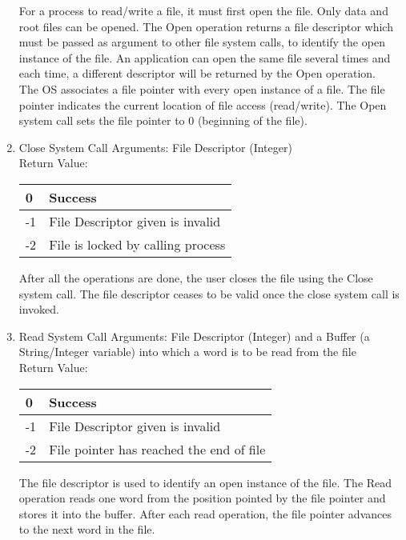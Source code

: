\begin{enumerate}
For a process to read/write a file, it must first open the file. Only data and root files can be opened. The Open operation returns a file descriptor which must be passed as argument to other file system calls, to identify the open instance of the file. An application can open the same file several times and each time, a different descriptor will be returned by the Open operation. 
\\
The OS associates a file pointer with every open instance of a file. The file pointer indicates the current location of file access (read/write). The Open system call sets the file pointer to 0 (beginning of the file).


\item{Close System Call}
Arguments: File Descriptor (Integer)\\
Return Value:
\FloatBarrier \begin{table}[H]
\centering
\begin{tabular}{|l|l|}
\hline
0  & Success           \\ \hline
-1 & File Descriptor given is invalid  \\ \hline
-2 & File is locked by calling process \\ \hline
\end{tabular}
\end{table} \FloatBarrier 

 After all the operations are done, the user closes the file using the Close system call. The file descriptor ceases to be valid once the close system call is invoked. 


\item{Read System Call}
Arguments: File Descriptor (Integer) and a Buffer (a String/Integer variable) into which a word is to be read from the file\\
Return Value:
\FloatBarrier \begin{table}[H]
\centering
\begin{tabular}{|l|l|}
\hline
0  & Success           \\ \hline
-1 & File Descriptor given is invalid  \\ \hline
-2 & File pointer has reached the end of file \\ \hline
\end{tabular}
\end{table} \FloatBarrier 

The file descriptor is used to identify an open instance of the file. The Read operation reads one word from the position pointed by the file pointer and stores it into the buffer. After each read operation, the file pointer advances to the next word in the file. 


\end{enumerate}
